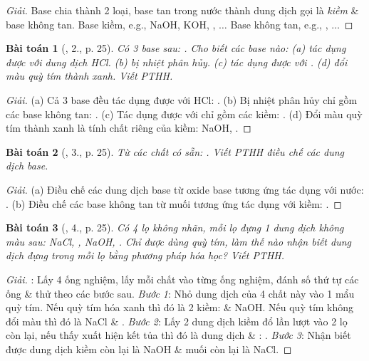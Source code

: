 \documentclass{article}
\newtheorem{baitoan}{Bài toán}
\begin{document}
\begin{proof}[Giải]
	Base chia thành 2 loại, base tan trong nước thành dung dịch gọi là \textit{kiềm} \& base không tan. Base kiềm, e.g., NaOH, KOH, , $\ldots$ Base không tan, e.g., , $\ldots$
\end{proof}

\begin{baitoan}[\cite{SGK_Hoa_Hoc_9}, 2., p. 25]
	Có 3 base sau: {\rm{}}. Cho biết các base nào: (a) tác dụng được với dung dịch {\rm HCl}. (b) bị nhiệt phân hủy. (c) tác dụng được với {\rm{}}. (d) đổi màu quỳ tím thành xanh. Viết {\rm PTHH}.
\end{baitoan}

\begin{proof}[Giải]
	(a) Cả 3 base đều tác dụng được với HCl: . (b) Bị nhiệt phân hủy chỉ gồm các base không tan: . (c) Tác dụng được với  chỉ gồm các kiềm: . (d) Đổi màu quỳ tím thành xanh là tính chất riêng của kiềm: NaOH, .
\end{proof}

\begin{baitoan}[\cite{SGK_Hoa_Hoc_9}, 3., p. 25]
	Từ các chất có sẵn: {\rm{}}. Viết {\rm PTHH} điều chế các dung dịch base.
\end{baitoan}

\begin{proof}[Giải]
	(a) Điều chế các dung dịch base từ oxide base tương ứng tác dụng với nước: . (b) Điều chế các base không tan từ muối tương ứng tác dụng với kiềm: .
\end{proof}

\begin{baitoan}[\cite{SGK_Hoa_Hoc_9}, 4., p. 25]
	Có 4 lọ không nhãn, mỗi lọ đựng 1 dung dịch không màu sau: {\rm NaCl, , NaOH, }. Chỉ được dùng quỳ tím, làm thế nào nhận biết dung dịch đựng trong mỗi lọ bằng phương pháp hóa học? Viết {\rm PTHH}.
\end{baitoan}

\begin{proof}[Giải]
	\cite[p. 20]{Ninh_giai_BT_Hoa_Hoc_9}: Lấy 4 ống nghiệm, lấy mỗi chất vào từng ống nghiệm, đánh số thứ tự các ống \& thử theo các bước sau. \textit{Bước 1}: Nhỏ dung dịch của 4 chất này vào 1 mẩu quỳ tím. Nếu quỳ tím hóa xanh thì đó là 2 kiềm:  \& NaOH. Nếu quỳ tím không đổi màu thì đó là NaCl \& . \textit{Bước 2}: Lấy 2 dung dịch kiềm đổ lần lượt vào 2 lọ còn lại, nếu thấy xuất hiện kết tủa thì đó là dung dịch  \& : . \textit{Bước 3}: Nhận biết được dung dịch kiềm còn lại là NaOH \& muối còn lại là NaCl.
\end{proof}
\end{document}
